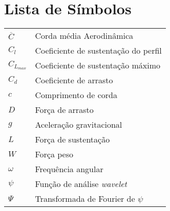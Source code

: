 \chapter{Lista de Símbolos}

\begin{tabular}{ll}
    $\overline{C}$ & Corda média Aerodinâmica \\
    $C_l$ & Coeficiente de sustentação do perfil\\
    $C_{L_{max}}$ & Coeficiente de sustentação máximo\\
    $C_d$ & Coeficiente de arrasto\\
    $c$ & Comprimento de corda\\
    $D$ & Força de arrasto\\
    $g$ & Aceleração gravitacional\\
    $L$ & Força de sustentação\\
    $W$ & Força peso\\
    $\omega$ & Frequência angular\\
    $\psi$ & Função de análise \textit{wavelet}\\
    $\Psi$ & Transformada de Fourier de $\psi$\\
\end{tabular}